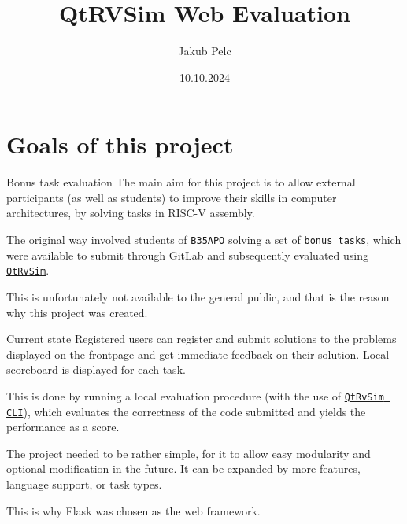\documentclass{beamer}
\title{QtRVSim Web Evaluation}
\date{10.10.2024}
\author{Jakub Pelc}
\institute{Faculty of Electrical Engineering, Czech Technical University in Prague}
\begin{document}
	\maketitle
	\section{Goals of this project}

	\begin{frame}{Bonus task evaluation}
		The main aim for this project is to allow external participants (as well as students) to improve their skills in computer architectures, by solving tasks in RISC-V assembly. \par

		The original way involved students of \href{https://cw.fel.cvut.cz/wiki/courses/b35apo/en/start}{\texttt{B35APO}} solving a set of \href{https://cw.fel.cvut.cz/wiki/courses/b35apo/en/homeworks/bonus/start}{\texttt{bonus tasks}},
		which were available to submit through GitLab and subsequently evaluated using \href{https://github.com/cvut/qtrvsim}{\texttt{QtRvSim}}. \par

		This is unfortunately not available to the general public, and that is the reason why this project was created.
	\end{frame}

	\begin{frame}{Current state}
		Registered users can register and submit solutions to the problems displayed on the frontpage and get immediate feedback on their solution.
		Local scoreboard is displayed for each task.\par

		This is done by running a local evaluation procedure (with the use of \href{https://github.com/cvut/qtrvsim}{\texttt{QtRvSim CLI}}), which evaluates the correctness of the code submitted and yields the performance as a score.

		The project needed to be rather simple, for it to allow easy modularity and optional modification in the future. It can be expanded by
		more features, language support, or task types. \par
		
		This is why Flask was chosen as the web framework.
	\end{frame}
	
\end{document}
